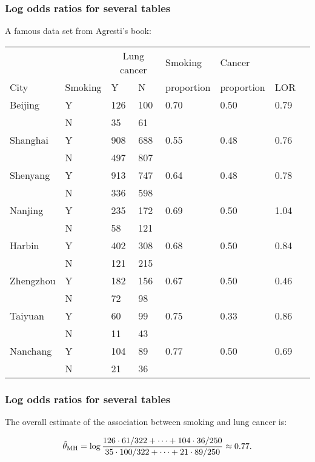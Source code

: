 \documentclass{beamer}
\begin{document}
\begin{frame}
\frametitle{Log odds ratios for several tables}

A famous data set from Agresti's book:

\begin{tiny}
\begin{center}
\begin{tabular}{llllllll}
          &             & \multicolumn{2}{c}{Lung cancer} & Smoking & Cancer\\
City      & Smoking & Y   & N & proportion & proportion & LOR\\[0.2ex]\hline
Beijing   & Y       & 126 & 100 & 0.70 & 0.50 & 0.79 & \\
          & N       &  35 &  61 &      &      &      & \\
Shanghai  & Y       & 908 & 688 & 0.55 & 0.48 & 0.76 & \\
          & N       & 497 & 807 &      &      &      & \\
Shenyang  & Y       & 913 & 747 & 0.64 & 0.48 & 0.78 & \\
          & N       & 336 & 598 &      &      &      & \\
Nanjing   & Y       & 235 & 172 & 0.69 & 0.50 & 1.04 & \\
          & N       &  58 & 121 &      &      &      & \\
Harbin    & Y       & 402 & 308 & 0.68 & 0.50 & 0.84 & \\
          & N       & 121 & 215 &      &      &      & \\
Zhengzhou & Y       & 182 & 156 & 0.67 & 0.50 & 0.46 & \\
          & N       &  72 &  98 &      &      &      & \\
Taiyuan   & Y       &  60 &  99 & 0.75 & 0.33 & 0.86 & \\
          & N       &  11 &  43 &      &      &      & \\
Nanchang  & Y       & 104 &  89 & 0.77 & 0.50 & 0.69 & \\
          & N       &  21 &  36 &      &      &      & \\\hline
\end{tabular}
\end{center}
\end{tiny}

\end{frame}


\begin{frame}
\frametitle{Log odds ratios for several tables}

The overall estimate of the association between smoking and lung
cancer is:

$$ \hat{\theta}_{\rm MH} = \log \frac{126\cdot 61/322 + \cdots +
104\cdot36/250}{35\cdot 100/322 + \cdots + 21\cdot 89/250} \approx
0.77.
$$

\end{frame}
\end{document}
